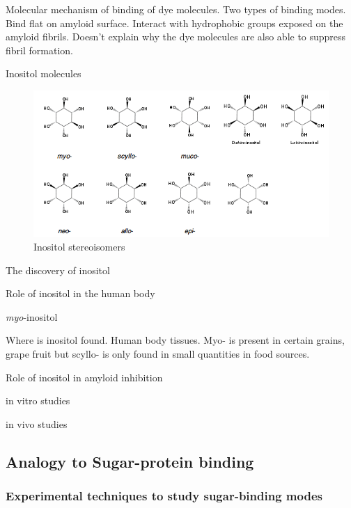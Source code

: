 \begin{outline}[enumerate]
	    \3 Molecular mechanism of binding of dye molecules. Two types of binding modes. Bind flat on amyloid surface. Interact with hydrophobic groups exposed on the amyloid fibrils. Doesn't explain why the dye molecules are also able to suppress fibril formation.
      
	\1 Inositol molecules
	
	\begin{figure}
    \centering
    \includegraphics[width=6in]{figures/introduction/inositol.png}
    \caption[Inositol]{Inositol stereoisomers}
    \label{fig:inositols}
  \end{figure}
  
		\2 The discovery of inositol
		
		\2 Role of inositol in the human body 
		
			\3 \emph{myo}-inositol
			
		\2 Where is inositol found. Human body tissues. Myo- is present in certain grains, grape fruit but scyllo- is only found in small quantities in food sources.
		
		\2 Role of inositol in amyloid inhibition
		
			\3 in vitro studies
			
			\3 in vivo studies
\end{outline}

\subsection{Analogy to Sugar-protein binding}
\subsubsection{Experimental techniques to study sugar-binding modes}
